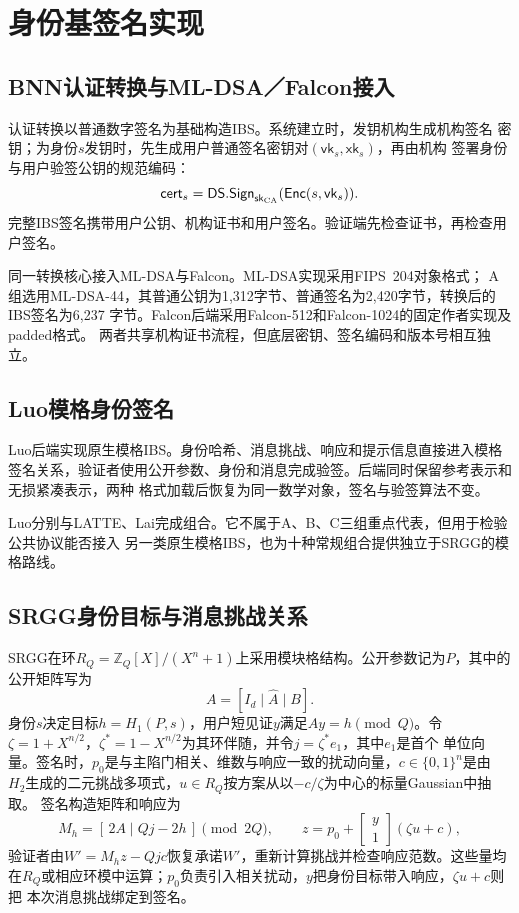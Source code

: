 \section{身份基签名实现}

\subsection{BNN认证转换与ML-DSA／Falcon接入}

认证转换以普通数字签名为基础构造IBS\cite{galindo2006ibs}。系统建立时，发钥机构生成机构签名
密钥；为身份$s$发钥时，先生成用户普通签名密钥对$(\mathsf{vk}_s,\mathsf{xk}_s)$，再由机构
签署身份与用户验签公钥的规范编码：
\[
 \mathsf{cert}_s=\mathsf{DS.Sign}_{\mathsf{sk}_{\rm CA}}
       (\mathsf{Enc}(s,\mathsf{vk}_s)).
\]
完整IBS签名携带用户公钥、机构证书和用户签名。验证端先检查证书，再检查用户签名。

同一转换核心接入ML-DSA与Falcon。ML-DSA实现采用FIPS~204对象格式\cite{nist2024fips204}；
A组选用ML-DSA-44，其普通公钥为1,312字节、普通签名为2,420字节，转换后的IBS签名为6,237
字节。Falcon后端采用Falcon-512和Falcon-1024的固定作者实现及padded格式\cite{falcon2020}。
两者共享机构证书流程，但底层密钥、签名编码和版本号相互独立。

\subsection{Luo模格身份签名}

Luo后端实现原生模格IBS\cite{luo2024ibs}。身份哈希、消息挑战、响应和提示信息直接进入模格
签名关系，验证者使用公开参数、身份和消息完成验签。后端同时保留参考表示和无损紧凑表示，两种
格式加载后恢复为同一数学对象，签名与验签算法不变。

Luo分别与LATTE、Lai完成组合。它不属于A、B、C三组重点代表，但用于检验公共协议能否接入
另一类原生模格IBS，也为十种常规组合提供独立于SRGG的模格路线。

\subsection{SRGG身份目标与消息挑战关系}

SRGG在环$R_Q=\mathbb Z_Q[X]/(X^n+1)$上采用模块格结构。公开参数记为$P$，其中的公开矩阵写为
\[
 A=[I_d\mid\widehat A\mid B].
\]
身份$s$决定目标$h=H_1(P,s)$，用户短见证$y$满足$Ay=h\pmod Q$。令
$\zeta=1+X^{n/2}$，$\zeta^*=1-X^{n/2}$为其环伴随，并令$j=\zeta^*e_1$，其中$e_1$是首个
单位向量。签名时，$p_0$是与主陷门相关、维数与响应一致的扰动向量，$c\in\{0,1\}^n$是由
$H_2$生成的二元挑战多项式，$u\in R_Q$按方案从以$-c/\zeta$为中心的标量Gaussian中抽取。
签名构造矩阵和响应为
\[
 M_h=[\,2A\mid Qj-2h\,]\pmod{2Q},
 \qquad
 z=p_0+\begin{bmatrix}y\\1\end{bmatrix}(\zeta u+c),
\]
验证者由$W'=M_hz-Qjc$恢复承诺$W'$，重新计算挑战并检查响应范数\cite{jia2025ibs}。这些量均
在$R_Q$或相应环模中运算；$p_0$负责引入相关扰动，$y$把身份目标带入响应，$\zeta u+c$则把
本次消息挑战绑定到签名。

